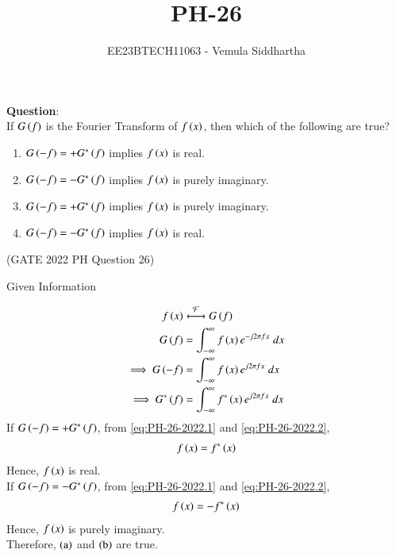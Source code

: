 \documentclass[journal,12pt,twocolumn]{IEEEtran}
\theoremstyle{remark}
\begin{document}

\vspace{3cm}

\title{PH-26}
\author{EE23BTECH11063 - Vemula Siddhartha}
\maketitle
\newpage
\bigskip

\renewcommand{\thefigure}{\theenumi}
\renewcommand{\thetable}{\theenumi}
\textbf{Question}:\\
If $G\left(f\right)$ is the Fourier Transform of $f\left(x\right)$, then which of the following are true?
\begin{enumerate}[label=(\alph*)]
    \item $G\left(-f\right)=+G^*\left(f\right)$ implies $f\left(x\right)$ is real.
    \item $G\left(-f\right)=-G^*\left(f\right)$ implies $f\left(x\right)$ is purely imaginary.
    \item $G\left(-f\right)=+G^*\left(f\right)$ implies $f\left(x\right)$ is purely imaginary.
    \item $G\left(-f\right)=-G^*\left(f\right)$ implies $f\left(x\right)$ is real.
\end{enumerate}
\hfill(GATE 2022 PH Question 26)\\
\solution
\begin{table}[h!]    
    \centering
    
    \caption{Given Information}
  \end{table}
\begin{align}
    f\brak{x} &\system{F} G\brak{f} \\
    G\brak{f} &= \int_{-\infty}^{\infty} f\brak{x} e^{-j 2 \pi f x}\;dx \\
    \implies G\brak{-f} &= \int_{-\infty}^{\infty} f\brak{x} e^{j 2 \pi f x}\; dx \label{eq:PH-26-2022.1} \\
    \implies G^*\brak{f} &= \int_{-\infty}^{\infty} f^*\brak{x} e^{j 2 \pi f x}\; dx \label{eq:PH-26-2022.2}
\end{align}
If $G\left(-f\right) = + G^*\left(f\right)$, from \eqref{eq:PH-26-2022.1} and \eqref{eq:PH-26-2022.2},
\begin{align}
    f\left(x\right) = f^*\left(x\right)
\end{align}
Hence, $f\left(x\right)$ is real. \\
If $G\left(-f\right) = - G^*\left(f\right)$, from \eqref{eq:PH-26-2022.1} and \eqref{eq:PH-26-2022.2},
\begin{align}
    f\left(x\right) = -f^*\left(x\right)
\end{align}
Hence, $f\left(x\right)$ is purely imaginary. \\
Therefore, $\left(\text{a}\right)$ and $\left(\text{b}\right)$ are true.
\end{document}
